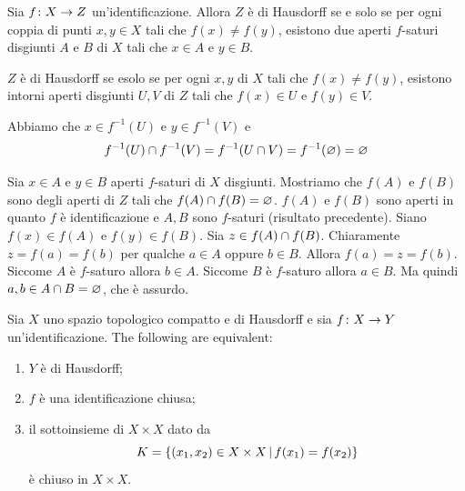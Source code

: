 \documentclass[a4paper]{article}
\begin{document}
\begin{snippetproposition}{}
    Sia \(f\colon X \to Z\) un'identificazione. Allora \(Z\)
    è di Hausdorff se e solo se per ogni coppia di punti \(x,y \in X\) tali
    che \(f(x) \neq f(y)\), esistono due aperti \(f\)-saturi disgiunti \(A\)
    e \(B\) di \(X\) tali che \(x\in A\) e \(y\in B\).
\end{snippetproposition}

\begin{snippetproof}{}
    \(Z\) è di Hausdorff se esolo se per ogni \(x,y\) di \(X\)
    tali che \(f(x) \neq f(y)\), esistono intorni aperti disgiunti \(U, V\) di \(Z\)
    tali che \(f(x) \in U\) e \(f(y) \in V\).
    \begin{iffproof}
        \item Abbiamo che \(x \in f^{-1}(U)\) e \(y \in f^{-1}(V)\) e
        \[
            f^{-1}(U) \cap f^{-1}(V)
            = f^{-1}(U \cap V) = f^{-1}(\varnothing) = \varnothing
        \]
        \item Sia \(x\in A\) e \(y\in B\) aperti \(f\)-saturi di \(X\) disgiunti.
        Mostriamo che \(f(A)\) e \(f(B)\) sono degli aperti di \(Z\)
        tali che \(f(A) \cap f(B) = \varnothing\).
        \(f(A)\) e \(f(B)\) sono aperti in quanto \(f\) è identificazione e \(A,B\)
        sono \(f\)-saturi (risultato precedente).
        Siano \(f(x) \in f(A)\) e \(f(y) \in f(B)\).
        Sia \(z \in f(A) \cap f(B)\).
        Chiaramente \(z = f(a) = f(b)\) per qualche \(a \in A\) oppure \(b\in B\).
        Allora \(f(a) = z = f(b)\).
        Siccome \(A\) è \(f\)-saturo allora \(b\in A\).
        Siccome \(B\) è \(f\)-saturo allora \(a\in B\).
        Ma quindi \(a,b \in A \cap B = \varnothing\), che è assurdo.
    \end{iffproof}
\end{snippetproof}

\begin{snippettheorem}{}
    Sia \(X\) uno spazio topologico compatto e di Hausdorff
    e sia \(f\colon X \to Y\) un'identificazione. The following are equivalent:
    \begin{enumerate}
        \item \(Y\) è di Hausdorff;
        \item \(f\) è una identificazione chiusa;
        \item il sottoinsieme di \(X \times X\)
        dato da
        \[
            K = \{(x_1, x_2) \in X \times X \,|\, f(x_1) = f(x_2)\}
        \]
        è chiuso in \(X \times X\).
    \end{enumerate}
\end{snippettheorem}
\end{document}
